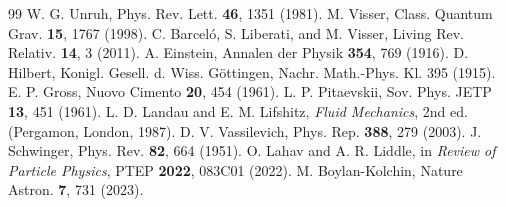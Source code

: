 \documentclass[11pt,a4paper]{article}
\begin{document}
\begin{thebibliography}{99}
 W. G. Unruh, Phys. Rev. Lett. \textbf{46}, 1351 (1981).
 M. Visser, Class. Quantum Grav. \textbf{15}, 1767 (1998).
 C. Barcel\'{o}, S. Liberati, and M. Visser, Living Rev. Relativ. \textbf{14}, 3 (2011).
 A. Einstein, Annalen der Physik \textbf{354}, 769 (1916).
 D. Hilbert, Konigl. Gesell. d. Wiss. Göttingen, Nachr. Math.-Phys. Kl. 395 (1915).
 E. P. Gross, Nuovo Cimento \textbf{20}, 454 (1961).
 L. P. Pitaevskii, Sov. Phys. JETP \textbf{13}, 451 (1961).
 L. D. Landau and E. M. Lifshitz, \textit{Fluid Mechanics}, 2nd ed. (Pergamon, London, 1987).
 D. V. Vassilevich, Phys. Rep. \textbf{388}, 279 (2003).
 J. Schwinger, Phys. Rev. \textbf{82}, 664 (1951).
 O. Lahav and A. R. Liddle, in \textit{Review of Particle Physics}, PTEP \textbf{2022}, 083C01 (2022).
 M. Boylan-Kolchin, Nature Astron. \textbf{7}, 731 (2023).
\end{thebibliography}
\end{document}
